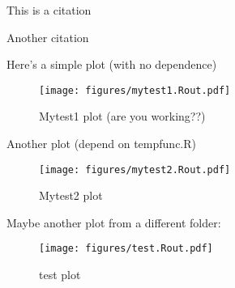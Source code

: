 \documentclass[12pt]{article}
\begin{document}


This is a citation \cite{Feng2016}

Another citation \cite{Anderson1991} 

Here's a simple plot (with no dependence)

\begin{figure}[h!]
    \centering
    \texttt{[image: figures/mytest1.Rout.pdf]}
    \caption{Mytest1 plot (are you working??)}
\end{figure}


Another plot (depend on tempfunc.R)

\begin{figure}[h]
    \centering
    \texttt{[image: figures/mytest2.Rout.pdf]}
    \caption{Mytest2 plot}
\end{figure}

Maybe another plot from a different folder:

\begin{figure}[h]
    \centering
    \texttt{[image: figures/test.Rout.pdf]}
    \caption{test plot}
\end{figure}






 
\end{document}
